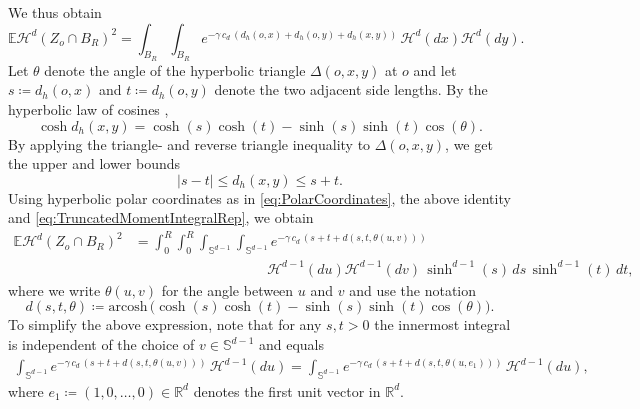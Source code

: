 \documentclass[11pt,a4paper]{article}
\theoremstyle{plain}
\theoremstyle{definition}
\theoremstyle{remark}
\def\EE{\mathbb{E}}
\def\RR{\mathbb{R}}
\def\SS{\mathbb{S}}
\def\cH{\mathcal{H}}
\newcommand{\arcosh}{\mathrm{arcosh\,}}
\begin{document}
We thus obtain
\begin{equation}\label{eq:TruncatedMomentIntegralRep}
\EE\cH^d(Z_o\cap B_R)^2 = \int_{B_R}\int_{B_R} e^{-\gamma\, c_d\,(d_h(o,x)+d_h(o,y)+d_h(x,y))}\,\cH^d(dx)\cH^d(dy).
\end{equation}
Let $\theta$ denote the angle of the hyperbolic triangle $\Delta(o,x,y)$ at $o$ and let $s\coloneqq d_h(o,x)$ and $t\coloneqq d_h(o,y)$ denote the two adjacent side lengths.
By the hyperbolic law of cosines \cite[Theorem 2.5.3]{Ratcliffe},
\[ \cosh d_h(x,y) = \cosh(s)\cosh(t)-\sinh(s)\sinh(t)\cos(\theta). \]
By applying the triangle- and reverse triangle inequality to $\Delta(o,x,y)$, we get the upper and lower bounds
\begin{equation}\label{eq:upper_lower_dist}
    |s-t| \leq  d_h(x,y) \leq s+t.
\end{equation}
Using hyperbolic polar coordinates as in \eqref{eq:PolarCoordinates}, the above identity and \eqref{eq:TruncatedMomentIntegralRep}, we obtain
\begin{align*}
\EE\cH^d(Z_o\cap B_R)^2
&= \int_0^R \int_0^R \int_{\SS^{d-1}} \int_{\SS^{d-1}} 
e^{-\gamma\, c_d \, (s+t+d(s,t,\theta(u,v)))}\\
&\hspace{4cm}\cH^{d-1}(du) \cH^{d-1}(dv)\, \sinh^{d-1}(s)\,ds\, \sinh^{d-1}(t)\,dt,    
\end{align*}
where we write $\theta(u,v)$ for the angle between $u$ and $v$ and use the notation
\[ d(s,t,\theta) \coloneqq \arcosh\big(\cosh(s)\cosh(t)-\sinh(s)\sinh(t)\cos(\theta)\big). \]
To simplify the above expression, note that for any $s,t > 0$ the innermost integral is independent of the choice of $v \in \SS^{d-1}$ and equals
\begin{align*}
\int_{\SS^{d-1}} e^{-\gamma\, c_d \, (s+t+d(s,t,\theta(u,v)))} \,\cH^{d-1}(du)
= \int_{\SS^{d-1}}e^{-\gamma\, c_d \, (s+t+d(s,t,\theta(u,e_1)))} \,\cH^{d-1}(du),
\end{align*}
where $e_1\coloneqq(1,0,\ldots,0)\in\RR^d$ denotes the first unit vector in $\RR^d$.
\end{document}
